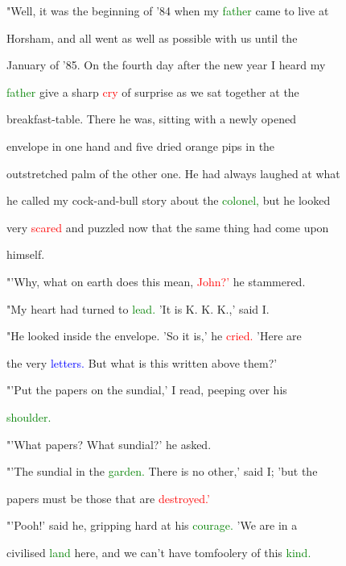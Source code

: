  "Well, it was the beginning of '84 when my \textcolor{green}{father} came to live at

 Horsham, and all went as well as possible with us until the

 January of '85. On the fourth day after the new year I heard my

 \textcolor{green}{father} give a sharp \textcolor{red}{cry} of \textcolor{BurntOrange}{surprise} as we sat together at the

 breakfast-table. There he was, sitting with a newly opened

 envelope in one hand and five dried orange pips in the

 outstretched palm of the other one. He had always \textcolor{BurntOrange}{laughed} at what

 he called my cock-and-bull story about the \textcolor{green}{colonel,} but he looked

 very \textcolor{red}{scared} and puzzled now that the same thing had come upon

 himself.



 "'Why, what on earth does this mean, \textcolor{red}{John?'} he stammered.



 "My heart had turned to \textcolor{green}{lead.} 'It is K. K. K.,' said I.



 "He looked inside the envelope. 'So it is,' he \textcolor{red}{cried.} 'Here are

 the very \textcolor{blue}{letters.} But what is this written above them?'



 "'Put the papers on the \textcolor{BurntOrange}{sundial,'} I read, peeping over his

 \textcolor{green}{shoulder.}



 "'What papers? What \textcolor{BurntOrange}{sundial?'} he asked.



 "'The \textcolor{BurntOrange}{sundial} in the \textcolor{green}{garden.} There is no other,' said I; 'but the

 papers must be those that are \textcolor{red}{destroyed.'}



 "'Pooh!' said he, gripping hard at his \textcolor{green}{courage.} 'We are in a

 civilised \textcolor{green}{land} here, and we can't have tomfoolery of this \textcolor{green}{kind.}


